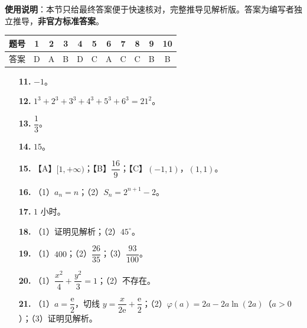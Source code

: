 
\begin{gknotice}
\textbf{使用说明}：本节只给最终答案便于快速核对，完整推导见解析版。答案为编写者独立推导，\textbf{非官方标准答案}。
\end{gknotice}

\begin{center}\begin{tabular}{ccccccccccc}
\toprule
题号 & 1 & 2 & 3 & 4 & 5 & 6 & 7 & 8 & 9 & 10 \\
\midrule
答案 & D & A & B & D & C & A & C & C & B & B \\
\bottomrule
\end{tabular}\end{center}

\begin{itemize}[leftmargin=2.6em]
  \item[\textbf{11.}] $-1$。
  \item[\textbf{12.}] $1^3+2^3+3^3+4^3+5^3+6^3=21^2$。
  \item[\textbf{13.}] $\dfrac13$。
  \item[\textbf{14.}] $15$。
\end{itemize}

\begin{itemize}[leftmargin=2.6em]
  \item[\textbf{15.}] 【A】$[1,+\infty)$；【B】$\dfrac{16}{9}$；【C】$(-1,1)$，$(1,1)$。
\end{itemize}

\begin{itemize}[leftmargin=2.6em]
  \item[\textbf{16.}] （1）$a_n=n$；（2）$S_n=2^{n+1}-2$。
  \item[\textbf{17.}] $1$ 小时。
  \item[\textbf{18.}] （1）证明见解析；（2）$45^\circ$。
  \item[\textbf{19.}] （1）$400$；（2）$\dfrac{26}{35}$；（3）$\dfrac{93}{100}$。
  \item[\textbf{20.}] （1）$\dfrac{x^2}{4}+\dfrac{y^2}{3}=1$；（2）不存在。
  \item[\textbf{21.}] （1）$a=\dfrac{\mathrm e}{2}$，切线 $y=\dfrac{x}{2\mathrm e}+\dfrac{\mathrm e}{2}$；（2）$\varphi(a)=2a-2a\ln(2a)$（$a>0$）；（3）证明见解析。
\end{itemize}
